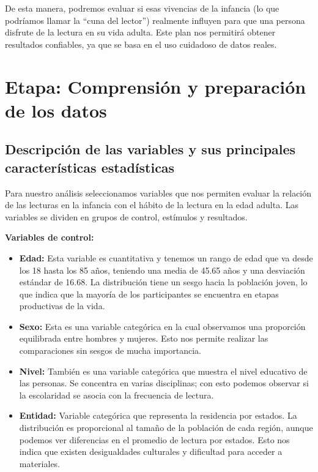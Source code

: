 \documentclass[aps,reprint]{revtex4-2}
\begin{document}
De esta manera, podremos evaluar si esas vivencias de la infancia (lo que podríamos llamar la “cuna del lector”) realmente influyen para que una persona disfrute de la lectura en su vida adulta. Este plan nos permitirá obtener resultados confiables, ya que se basa en el uso cuidadoso de datos reales.

\vspace{0.5cm}

\section{Etapa: Comprensión y preparación de los datos}
\subsection{Descripción de las variables y sus principales características estadísticas}

Para nuestro análisis seleccionamos variables que nos permiten evaluar la relación de las lecturas en la infancia con el hábito de la lectura en la edad adulta. Las variables se dividen en grupos de control, estímulos y resultados.
\vspace{0.5cm}

\textbf{Variables de control:}

\begin{itemize}
    \item \textbf{Edad:} Esta variable es cuantitativa y tenemos un rango de edad que va desde los 18 hasta los 85 años, teniendo una media de 45.65 años y una desviación estándar de 16.68. La distribución tiene un sesgo hacia la población joven, lo que indica que la mayoría de los participantes se encuentra en etapas productivas de la vida.

    \item \textbf{Sexo:} Esta es una variable categórica en la cual observamos una proporción equilibrada entre hombres y mujeres. Esto nos permite realizar las comparaciones sin sesgos de mucha importancia.

    \item \textbf{Nivel:} También es una variable categórica que muestra el nivel educativo de las personas. Se concentra en varias disciplinas; con esto podemos observar si la escolaridad se asocia con la frecuencia de lectura.

    \item \textbf{Entidad:} Variable categórica que representa la residencia por estados. La distribución es proporcional al tamaño de la población de cada región, aunque podemos ver diferencias en el promedio de lectura por estados. Esto nos indica que existen desigualdades culturales y dificultad para acceder a materiales.
\end{itemize}
\end{document}

